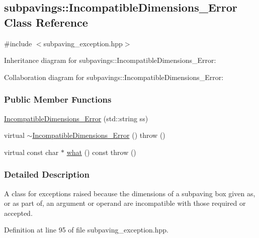 \hypertarget{classsubpavings_1_1IncompatibleDimensions__Error}{\subsection{subpavings\-:\-:\-Incompatible\-Dimensions\-\_\-\-Error \-Class \-Reference}
\label{classsubpavings_1_1IncompatibleDimensions__Error}
}


{\ttfamily \#include $<$subpaving\-\_\-exception.\-hpp$>$}



\-Inheritance diagram for subpavings\-:\-:\-Incompatible\-Dimensions\-\_\-\-Error\-:


\-Collaboration diagram for subpavings\-:\-:\-Incompatible\-Dimensions\-\_\-\-Error\-:
\subsubsection*{\-Public \-Member \-Functions}
\begin{DoxyCompactItemize}
\item 
\hyperlink{classsubpavings_1_1IncompatibleDimensions__Error_a9eba63beb13e2cf8e0d1cfa611f4bf97}{\-Incompatible\-Dimensions\-\_\-\-Error} (std\-::string ss)
\item 
virtual \hyperlink{classsubpavings_1_1IncompatibleDimensions__Error_a0d37b44a8cdcff89706998e310a46f08}{$\sim$\-Incompatible\-Dimensions\-\_\-\-Error} ()  throw ()
\item 
virtual const char $\ast$ \hyperlink{classsubpavings_1_1IncompatibleDimensions__Error_ab6f29f87f7ed89b14af0168dfaaf8851}{what} () const   throw ()
\end{DoxyCompactItemize}


\subsubsection{\-Detailed \-Description}
\-A class for exceptions raised because the dimensions of a subpaving box given as, or as part of, an argument or operand are incompatible with those required or accepted. 

\-Definition at line 95 of file subpaving\-\_\-exception.\-hpp.



